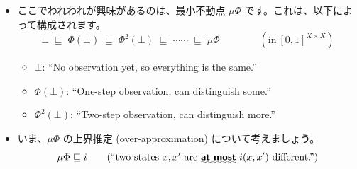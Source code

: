 \documentclass[
		head_space=20mm,
		foot_space=20mm,
		gutter=10mm,
		line_length=190mm
]{jlreq}
\begin{document}
\begin{itemize}
	\[\begin{array}{cccccc}
		\Phi\colon & [0,1]^{X\times X} & \;\xrightarrow[\substack{\textrm{Wasserstein}\\\textrm{lifting}}]{\mathcal W}\hspace*{-25pt} & [0,1]^{\mathcal DX\times\mathcal DX} & \hspace*{-45pt}\xrightarrow[~~~~~\substack{\textrm{pullback}\\\textrm{by MC}}~~~~~]{(c\times c)^\ast}\hspace*{-45pt} & [0,1]^{X\times X} \\[2pt]
		{} & \rotatebox{90}{$\in$} && \rotatebox{90}{$\in$} && \rotatebox{90}{$\in$} \\[1pt]
		& d & \longmapsto & \left(\begin{array}{l}(\alpha,\beta)\mapsto\\\displaystyle\inf_{\substack{\gamma:\;\textrm{coupling}\\\textrm{of}\;\alpha,\beta}}\sum_{x,x'}\begin{array}{l}\gamma(x,x')\\[-2pt]\,\cdot\, d(x,x')\end{array}\end{array}\right) & \longmapsto & \left(\begin{array}{ccc}
			X\times X & \xrightarrow{c\times c} & \mathcal DX\times\mathcal DX \\
			&& ~~~\downarrow\substack{\mathcal W(d)}\!\!\! \\
			& & [0,1]
		\end{array}\right)
	\end{array}\]
	\item ここでわれわれが興味があるのは、最小不動点 $\mu\Phi$ です。これは、以下によって構成されます。
	\[\bot\;\sqsubseteq\;\Phi(\bot)\;\sqsubseteq\;\Phi^2(\bot)\;\sqsubseteq\;\cdots\cdots\;\sqsubseteq\;\mu\Phi\qquad\qquad(\textrm{in}~[0,1]^{X\times X})\]
	\begin{itemize}
		\item $\bot$: ``No observation yet, so everything is the same.''
		\item $\Phi(\bot)$: ``One-step observation, can distinguish some.''
		\item $\Phi^2(\bot)$: ``Two-step observation, can distinguish more.''
	\end{itemize}
	\item いま、$\mu\Phi$ の上界推定 (over-approximation) について考えましょう。
	\[\mu\Phi\sqsubseteq i\qquad\textrm{(``two states $x,x'$ are \uwave{\textgt{at most}} $i(x,x')$-different.'')}\] 

\end{itemize}
\end{document}
